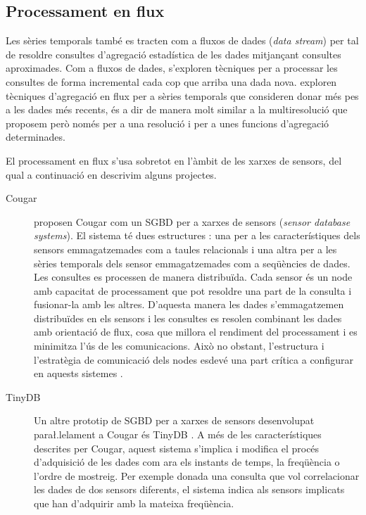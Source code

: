 \subsection{Processament en flux}


Les sèries temporals també es tracten com a fluxos de dades
(\emph{data stream}) per tal de resoldre consultes d'agregació
estadística de les dades mitjançant consultes aproximades.  Com a
fluxos de dades, s'exploren tècniques per a processar les consultes de
forma incremental cada cop que arriba una dada nova.
\textcite{cormode08:pods} exploren tècniques d'agregació en flux per a
sèries temporals que consideren donar més pes a les dades més recents,
és a dir de manera molt similar a la multiresolució que proposem però
només per a una resolució i per a unes funcions d'agregació
determinades.

El processament en flux  s'usa sobretot en l'àmbit de les xarxes de
sensors, del qual a continuació en descrivim alguns projectes.


\begin{description}

\item[Cougar] \textcite{cougar,fung02} proposen Cougar com un
  \gls{SGBD} per a xarxes de sensors (\emph{sensor database
    systems}). El sistema té dues estructures \parencite{bonnet01}:
  una per a les característiques dels sensors emmagatzemades com a
  taules relacionals i una altra per a les sèries temporals dels
  sensor emmagatzemades com a seqüències de dades.  Les consultes es
  processen de manera distribuïda. Cada sensor és un node amb
  capacitat de processament que pot resoldre una part de la consulta i
  fusionar-la amb les altres. D'aquesta manera les dades
  s'emmagatzemen distribuïdes en els sensors i les consultes es
  resolen combinant les dades amb orientació de flux, cosa que millora
  el rendiment del processament i es minimitza l'ús de les
  comunicacions.  Això no obstant, l'estructura i l'estratègia de
  comunicació dels nodes esdevé una part crítica a configurar en
  aquests sistemes \parencite{demers03}.


\item[TinyDB] Un altre prototip de \gls{SGBD} per a xarxes de sensors
  desenvolupat para\l.lelament a Cougar és
  TinyDB \parencite{tinyDB,madden05}. A més de les característiques
  descrites per Cougar, aquest sistema s'implica i modifica el procés
  d'adquisició de les dades com ara els instants de temps, la
  freqüència o l'ordre de mostreig. Per exemple donada una consulta
  que vol correlacionar les dades de dos sensors diferents, el sistema
  indica als sensors implicats que han d'adquirir amb la mateixa
  freqüència.


\end{description}




